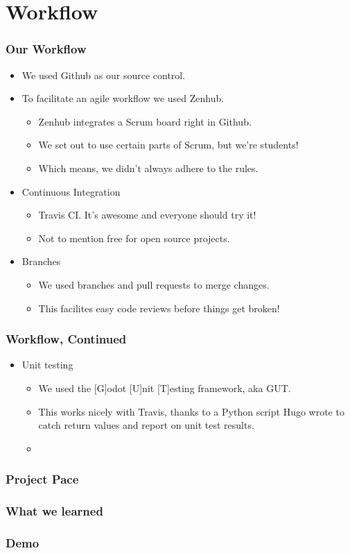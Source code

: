 \documentclass{beamer}
\begin{document}
\section{Workflow} %
\begin{frame}
    \frametitle{Our Workflow} 
    \begin{itemize}
    		\pause \item We used Github as our source control.
    		\pause \item To facilitate an agile workflow we used Zenhub.
    		\begin{itemize}
    		\pause \item Zenhub integrates a Scrum board right in Github.
    		\pause \item We set out to use certain parts of Scrum, but we're students!
    		\pause \item Which means, we didn't always adhere to the rules.
    		\end{itemize}
    		\pause \item Continuous Integration
    		\begin{itemize}
    			\pause \item Travis CI. It's awesome and everyone should try it!
    			\pause \item Not to mention free for open source projects. 
    		\end{itemize}
    		\pause \item Branches
    		\begin{itemize}
    			\pause \item We used branches and pull requests to merge changes.
    			\pause \item This facilites easy code reviews before things get broken!
    		\end{itemize}
    \end{itemize}
\end{frame}

\begin{frame}
    \frametitle{Workflow, Continued}
    \begin{itemize}
    		\pause \item Unit testing
    		\begin{itemize}
    			\pause \item We used the [G]odot [U]nit [T]esting framework, aka GUT.
    			\pause \item This works nicely with Travis, thanks to a Python script Hugo wrote to catch return values and report on unit test results.
    			\pause \item 
    		\end{itemize}
	\end{itemize}     
\end{frame}

\begin{frame}
    \frametitle{Project Pace} %
\end{frame}

\begin{frame}
  \frametitle{What we learned} %
\end{frame}

\begin{frame}
  \frametitle{Demo} %
\end{frame}
\end{document}
